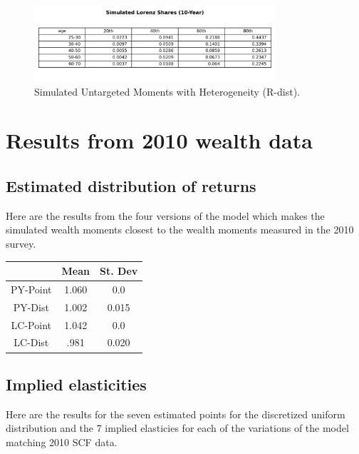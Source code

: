 \begin{figure}[htbp]
\centering
\includegraphics[width=0.8\textwidth]{Tables/Sim_Lorenz_10yr_LCrrDistNetWorth_2007.png}
\caption{Simulated Untargeted Moments with Heterogeneity (R-dist).}
\label{fig:SimLorenzTarDist2007}
\end{figure}

\section{Results from 2010 wealth data}

\subsection{Estimated distribution of returns}

\par Here are the results from the four versions of the model  which makes the simulated wealth moments closest to the wealth moments measured in the 2010 survey.

\begin{center}
    \begin{tabular}{|c|c|c|}
\hline
& Mean & St. Dev \\
\hline
PY-Point & 1.060 & 0.0  \\
PY-Dist & 1.002  &  0.015  \\
LC-Point & 1.042 & 0.0  \\
LC-Dist & .981  &  0.020 \\
\hline
    \end{tabular}
    \end{center}

\subsection{Implied elasticities}

\par Here are the results for the seven estimated points for the discretized uniform distribution and the 7 implied elasticies for each of the variations of the model matching 2010 SCF data. 

